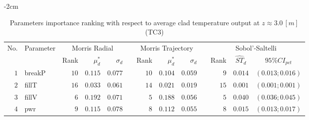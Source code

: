 \begin{table*}[!htbp]\centering
{}
\begin{adjustwidth*}{}{-2cm}
\caption{Parameters importance ranking with respect to average clad temperature output at $z \approx 3.0 \, [m]$ (TC$3$)}
\label{tab:app_screening_tc3_average}
\begin{tabular}{@{}rlrrrrrrrrrcc@{}}\toprule
\multirow{2}{*}{\footnotesize{No.}} & \multirow{2}{*}{\footnotesize{Parameter}} & \multicolumn{3}{c}{\footnotesize{Morris Radial}} & \phantom{a} & \multicolumn{3}{c}{\footnotesize{Morris Trajectory}}  &\phantom{a}& \multicolumn{3}{c}{\footnotesize{Sobol'-Saltelli}}                               \\             
                                                                                  \cmidrule{3-5}                                                   \cmidrule{7-9}                                                      \cmidrule{11-13}
                                    &                                           & \footnotesize{Rank}   & $\mu^*_d$ & $\sigma_d$   &             & \footnotesize{Rank} & $\mu^*_d$ & $\sigma_d$          &           & \footnotesize{Rank} & \footnotesize{$\hat{ST}_d$} & \footnotesize{$95\%CI_{pct}$}\\ \midrule
\footnotesize{$1 $} & \footnotesize{breakP   } & \footnotesize{$10$} & \footnotesize{$0.115$} & \footnotesize{$0.077$} && \footnotesize{$10$} & \footnotesize{$0.104$} & \footnotesize{$0.059$} && \footnotesize{$9 $} & \footnotesize{$0.014$} & \footnotesize{$(0.013;0.016)$} \\
\footnotesize{$2 $} & \footnotesize{fillT    } & \footnotesize{$16$} & \footnotesize{$0.033$} & \footnotesize{$0.061$} && \footnotesize{$14$} & \footnotesize{$0.021$} & \footnotesize{$0.019$} && \footnotesize{$15$} & \footnotesize{$0.001$} & \footnotesize{$(0.001;0.001)$} \\
\footnotesize{$3 $} & \footnotesize{fillV    } & \footnotesize{$6 $} & \footnotesize{$0.192$} & \footnotesize{$0.071$} && \footnotesize{$5 $} & \footnotesize{$0.188$} & \footnotesize{$0.056$} && \footnotesize{$5 $} & \footnotesize{$0.040$} & \footnotesize{$(0.036;0.045)$} \\
\footnotesize{$4 $} & \footnotesize{pwr      } & \footnotesize{$9 $} & \footnotesize{$0.115$} & \footnotesize{$0.078$} && \footnotesize{$8 $} & \footnotesize{$0.112$} & \footnotesize{$0.055$} && \footnotesize{$8 $} & \footnotesize{$0.015$} & \footnotesize{$(0.013;0.017)$} \\

\end{tabular}
\end{adjustwidth*}
\end{table*}
